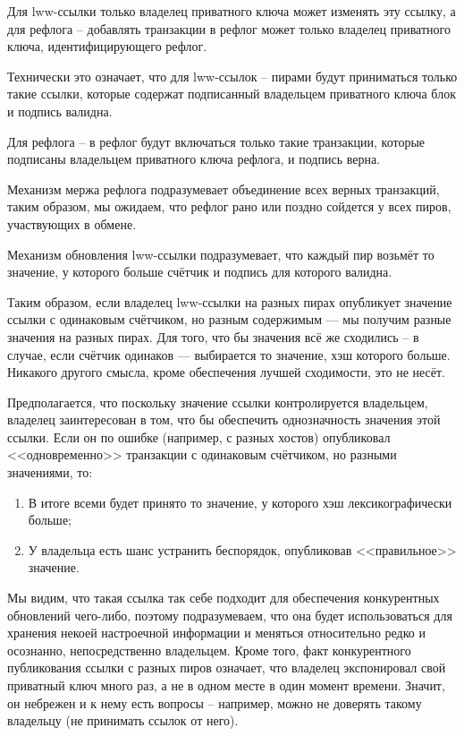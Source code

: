 \documentclass[11pt,a4paper]{article}
\begin{document}
Для lww-ссылки только владелец приватного ключа может изменять эту ссылку, а для рефлога --
добавлять транзакции в рефлог может только владелец приватного ключа, идентифицирующего
рефлог.

Технически это означает, что для lww-ссылок -- пирами будут приниматься только такие ссылки,
которые содержат подписанный владельцем приватного ключа блок и подпись валидна.

Для рефлога -- в рефлог будут включаться только такие транзакции, которые подписаны владельцем
приватного ключа рефлога, и подпись верна.

Механизм мержа рефлога подразумевает объединение всех верных транзакций, таким образом, мы ожидаем,
что рефлог рано или поздно сойдется у всех пиров, участвующих в обмене.

Механизм обновления lww-ссылки подразумевает, что каждый пир возьмёт то значение, у которого
больше счётчик и подпись для которого валидна.

Таким образом, если владелец lww-ссылки на разных пирах опубликует значение ссылки с одинаковым
счётчиком, но разным содержимым --- мы получим разные значения на разных пирах. Для того, что бы
значения всё же сходились -- в случае, если счётчик одинаков --- выбирается то значение, хэш
которого больше. Никакого другого смысла, кроме обеспечения лучшей сходимости, это не несёт.

Предполагается, что поскольку значение ссылки контролируется владельцем, владелец заинтересован
в том, что бы обеспечить однозначность значения этой ссылки. Если он по ошибке (например, с разных
хостов) опубликовал <<одновременно>> транзакции с одинаковым счётчиком, но разными значениями, то:

\begin{enumerate}
  \item В итоге всеми будет принято то значение, у которого хэш лексикографически больше;
  \item У владельца есть шанс устранить беспорядок, опубликовав <<правильное>> значение.
\end{enumerate}

Мы видим, что такая ссылка так себе подходит для обеспечения конкурентных обновлений чего-либо,
поэтому подразумеваем, что она будет использоваться для хранения некоей настроечной информации и
меняться относительно редко и осознанно, непосредственно владельцем. Кроме того, факт конкурентного
публикования ссылки с разных пиров означает, что владелец экспонировал свой приватный ключ много
раз, а не в одном месте в один момент времени. Значит, он небрежен и к нему есть вопросы --
например, можно не доверять такому владельцу (не принимать ссылок от него).
\end{document}
